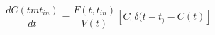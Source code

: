 \begin{equation}
\frac{dC(tmt_{in})}{dt} = \frac{F(t,t_{in})}{V(t)}[C_0\delta(t-t_)-C(t)]
\end{equation}